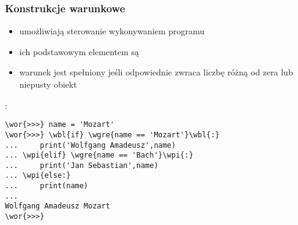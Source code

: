 \begin{frame}[fragile]
\frametitle{Konstrukcje warunkowe}

\begin{minipage}[t]{.45\textwidth}\vspace{0pt}
\begin{itemize}\small
 \item umożliwiają sterowanie wykonywaniem programu

 \item ich podstawowym elementem są 

 \item warunek jest spełniony jeśli odpowiednie  zwraca liczbę różną od zera lub niepusty obiekt
\end{itemize}
\raggedright 
{}:\newline
{}\newline
{}\newline
{}\newline
{}
\end{minipage}\hspace{.02\textwidth}%
\begin{minipage}[t]{.52\textwidth}\vspace{0pt}
\begin{Verbatim}[fontsize=\scriptsize,codes={\catcode`$=3\catcode`^=7},
                 frame=single,framesep=3mm,commandchars=\\\{\},gobble=0]
\wor{>>>} name = 'Mozart'
\wor{>>>} \wbl{if} \wgre{name == 'Mozart'}\wbl{:}
...     print('Wolfgang Amadeusz',name)
... \wpi{elif} \wgre{name == 'Bach'}\wpi{:}
...     print('Jan Sebastian',name)
... \wpi{else:}
...     print(name)
...
Wolfgang Amadeusz Mozart
\wor{>>>}
\end{Verbatim}
\end{minipage}
\end{frame}

